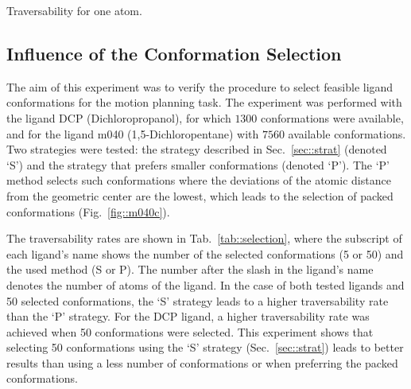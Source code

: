 \documentclass[usletter, 10pt, conference]{ieeeconf} %
\def\LA{L_1}
\def\LB{L_2}
\begin{document}
{\begin{table}[ht]
\centering
\caption{\label{tab::one}
    \small
    Traversability for one atom.
}
\renewcommand{\tabcolsep}{4.3pt}
{\footnotesize
\renewcommand{\arraystretch}{0.7}

}
\end{table}



%

\subsection{Influence of the Conformation Selection}

The aim of this experiment was to verify the procedure to select feasible ligand conformations for the motion planning task.
The experiment was performed with the ligand DCP (Dichloropropanol), for which $1300$ conformations were available, and for the ligand
m040 (1,5-Dichloropentane) with $7560$ available conformations.
Two strategies were tested: the strategy described in Sec.~\ref{sec::strat} (denoted `S') and the strategy that prefers smaller conformations (denoted `P').
The `P' method selects such conformations where the deviations of the atomic distance from the geometric center are the lowest, which leads 
to the selection of packed conformations (Fig.~\ref{fig::m040c}).

The traversability rates are shown in Tab.~\ref{tab::selection}, where the subscript of each ligand's 
name shows the number of the selected conformations (5 or 50) and the used method (S or P).
The number after the slash in the ligand's name denotes the number of atoms of the ligand.
In the case of both tested ligands and 50 selected conformations, the `S' strategy leads to a higher traversability rate than the `P' strategy.
For the DCP ligand, a higher traversability rate was achieved when 50 conformations were selected.
This experiment shows that selecting 50 conformations using the `S' strategy (Sec.~\ref{sec::strat}) leads to better results
than using a less number of conformations or when preferring the packed conformations.

}
\end{document}

